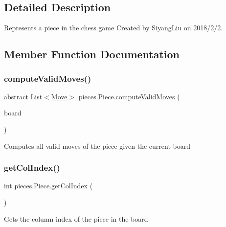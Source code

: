 \subsection{Detailed Description}
Represents a piece in the chess game Created by Siyang\+Liu on 2018/2/2. 

\subsection{Member Function Documentation}
\mbox{\label{classpieces_1_1_piece_ab9a0e46deaaa05e8bea7a59ccda801ab}} 
\subsubsection{\texorpdfstring{compute\+Valid\+Moves()}{computeValidMoves()}}
{\footnotesize\ttfamily abstract List$<$\mbox{\hyperlink{classpieces_1_1_move}{Move}}$>$ pieces.\+Piece.\+compute\+Valid\+Moves (\begin{DoxyParamCaption}\item[{final \mbox{\hyperlink{classgameboard_1_1_game_board}{Game\+Board}}}]{board }\end{DoxyParamCaption})\hspace{0.3cm}{\ttfamily [abstract]}}

Computes all valid moves of the piece given the current board \mbox{\label{classpieces_1_1_piece_a5ac1137f5b634718b310ba4b01d3a592}} 
\subsubsection{\texorpdfstring{get\+Col\+Index()}{getColIndex()}}
{\footnotesize\ttfamily int pieces.\+Piece.\+get\+Col\+Index (\begin{DoxyParamCaption}{ }\end{DoxyParamCaption})}

Gets the column index of the piece in the board \mbox{\label{classpieces_1_1_piece_a3442ea119c005e9736d5cd53efd499e8}} 
